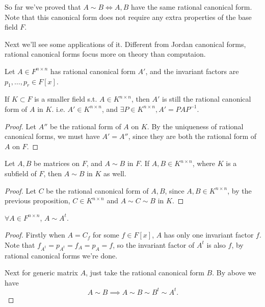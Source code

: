 So far we've proved that $A\sim B \iff A,B$ have the same
rational canonical form. Note that this canonical form
does not require any extra properties of the base field $F$.

Next we'll see some applications of it.
Different from Jordan canonical forms, rational canonical forms
focus more on theory than computaion.

\begin{proposition}
	Let $A\in F^{n\times n}$ has rational canonical form $A'$,
	and the invariant factors are $p_1,\dots,p_r\in F[x]$.

	If $K \subset F$ is a smaller field s.t. $A\in K^{n\times n}$,
	then $A'$ is still the rational canonical form of $A$ in $K$.
	i.e. $A'\in K^{n\times n}$, and $\exists P\in K^{n\times n}, A' = PAP^{-1}$.
\end{proposition}
\begin{proof}[Proof]
    Let $A''$ be the rational form of $A$ on $K$.
	By the uniqueness of rational canonical forms,
	we must have $A' = A''$, since they are both the
	rational form of $A$ on $F$.
\end{proof}

\begin{proposition}
	Let $A,B$ be matrices on $F$, and $A\sim B$ in $F$.
	If $A,B\in K^{n\times n}$, where $K$ is a subfield of $F$,
	then $A\sim B$ in $K$ as well.
\end{proposition}
\begin{proof}[Proof]
    Let $C$ be the rational canonical form of $A,B$,
	since $A,B\in K^{n\times n}$, by the previous proposition,
	$C\in K^{n\times n}$ and $A\sim C\sim B$ in $K$.
\end{proof}

\begin{proposition}
	$\forall A\in F^{n\times n}$, $A\sim A^t$.
\end{proposition}
\begin{proof}[Proof]
	Firstly when $A = C_f$ for some $f\in F[x]$,
	$A$ has only one invariant factor $f$.
	Note that $f_{A^t} = p_{A^t} = f_A = p_A = f$, so
	the invariant factor of $A^t$ is also $f$,
	by rational canonical forms we're done.

	Next for generic matrix $A$,
	just take the rational canonical form $B$.
	By above we have
	\[
	A \sim B\implies A\sim B\sim B^t \sim A^t.
	\]
\end{proof}

